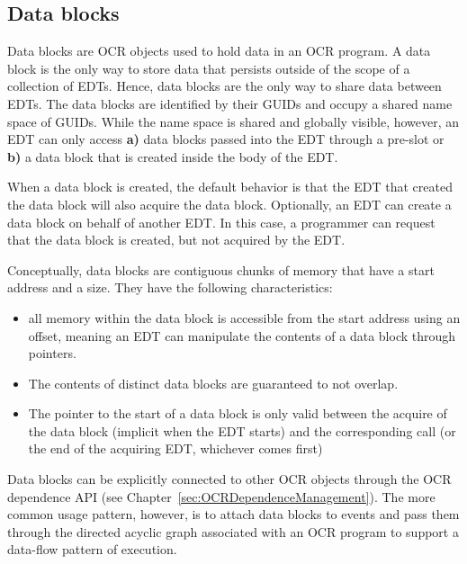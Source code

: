\subsection{Data blocks}
\label{sec:data blocks}
Data blocks are OCR objects used to hold data in an OCR program. A
data block is the only way to store data that persists outside of the
scope of a collection of EDTs. Hence, data blocks are the only way to
share data between EDTs. The data blocks are identified by their
GUIDs and occupy a shared name space of GUIDs. While the name space
is shared and globally visible, however, an EDT can only access {\bf a)}
data blocks passed into the EDT through a pre-slot or {\bf b)} a data block
that is created inside the body of the EDT.

When a data block is created, the default behavior is that the EDT
that created the data block will also acquire the data block.
Optionally, an EDT can
create a data block on behalf of another EDT. In this case, a
programmer can request that the data block is created, but not
acquired by the EDT.

Conceptually, data blocks are contiguous chunks of memory
that have a start address and a size. They have the following characteristics:
\begin{itemize}
\item all memory within the data block is accessible from the
start address using an offset, meaning an EDT can manipulate the
contents of a data block through pointers.
\item The contents of distinct data blocks are guaranteed to not
overlap.
\item The pointer to the start of a data block is only valid between
the acquire of the data block (implicit when the EDT starts) and the
corresponding  call (or the end of the acquiring
EDT, whichever comes first)
\end{itemize}

Data blocks can be explicitly connected to other OCR objects through the OCR
dependence API (see Chapter~\ref{sec:OCRDependenceManagement}).
The more common usage pattern, however, is
to attach data blocks to events and pass them through the
directed acyclic graph associated with an OCR program to support a
data-flow pattern of execution.

